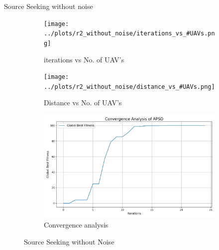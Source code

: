 \documentclass[aspectratio=169]{beamer}
\begin{document}
\begin{frame}{Source Seeking without noise}    
    \begin{figure}[h]
        \centering
        \begin{subfigure}[b]{0.32\textwidth}
            \centering
            \texttt{[image: ../plots/r2\_without\_noise/iterations\_vs\_\#UAVs.png]}
            \caption{iterations vs No. of UAV's}
        \end{subfigure}
        \hfill
        \begin{subfigure}[b]{0.32\textwidth}
            \centering
            \texttt{[image: ../plots/r2\_without\_noise/distance\_vs\_\#UAVs.png]}
            \caption{Distance vs No. of UAV's}
        \end{subfigure}
        \hfill
        \begin{subfigure}[b]{0.32\textwidth}
            \centering
            \includegraphics[width=\textwidth]{../plots/r2_without_noise/convergence_analysis.png}
            \caption{Convergence analysis}
        \end{subfigure}
        \caption{Source Seeking without Noise}
    \end{figure}
\end{frame}
\end{document}
